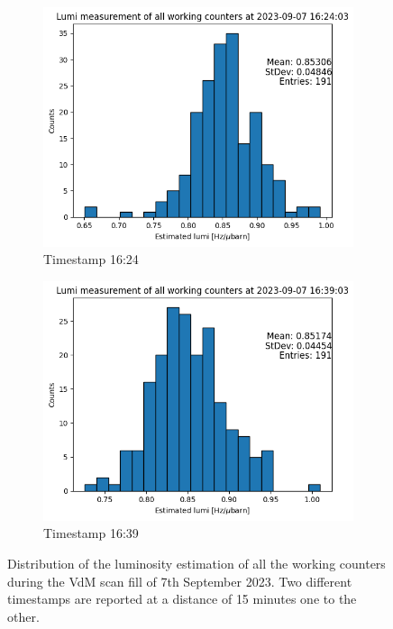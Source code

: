 \begin{figure}
    \centering
    \begin{subfigure}{0.48\textwidth}
    \includegraphics[width=\linewidth]{figures/lumi_hist_1624.png}
    \caption{Timestamp 16:24}\label{fig:lumi1624}
    \end{subfigure}
    \begin{subfigure}{0.48\textwidth}
    \includegraphics[width=\linewidth]{figures/lumi_hist_1639.png}
    \caption{Timestamp 16:39}\label{fig:lumi1639}
    \end{subfigure}
    \caption{Distribution of the luminosity estimation of all the working counters during the VdM scan fill of 7th September 2023. Two different timestamps are reported at a distance of 15 minutes one to the other. }
    \label{fig:lumi_hist_ts}
\end{figure}



